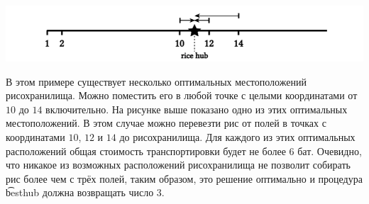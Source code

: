 \includegraphics[width=18cm]{ricehub.png}

В этом примере существует несколько оптимальных местоположений рисохранилища. Можно поместить его в любой точке с целыми координатами от $10$ до $14$ включительно. На рисунке выше показано одно из этих оптимальных местоположений. В этом случае можно перевезти рис от полей в точках с координатами $10$, $12$ и $14$ до рисохранилища. Для каждого из этих оптимальных расположений общая стоимость транспортировки будет не более $6$ бат. Очевидно, что никакое из возможных расположений рисохранилища не позволит собирать рис более чем с трёх полей, таким образом, это решение оптимально и процедура \t{besthub} должна возвращать число $3$.